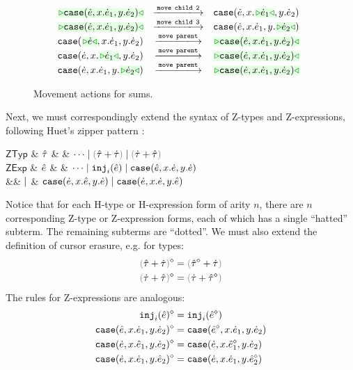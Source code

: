 \begin{figure}
\begin{displaymath}
\begin{array}{@{}rcl}
  \TABperformMove
      {\zwsel{\hcase{\hexp}{x}{\hexp_1}{y}{\hexp_2}}}
      {\aMove{\dChildn{2}}}
      {      {\hcase{\hexp}{x}{\zwsel{\hexp_1}}{y}{\hexp_2}}}
  \\
  \TABperformMove
      {\zwsel{\hcase{\hexp}{x}{\hexp_1}{y}{\hexp_2}}}
      {\aMove{\dChildn{3}}}
      {      {\hcase{\hexp}{x}{\hexp_1}{y}{\zwsel{\hexp_2}}}}
  \\
  \TABperformMove
      {      {\hcase{\zwsel{\hexp}}{x}{\hexp_1}{y}{\hexp_2}}}
      {\aMove{\dParent}}
      {\zwsel{\hcase{{\hexp}}{x}{\hexp_1}{y}{\hexp_2}}}
  \\
  \TABperformMove
      {      {\hcase{{\hexp}}{x}{\zwsel{\hexp_1}}{y}{\hexp_2}}}
      {\aMove{\dParent}}
      {\zwsel{\hcase{{\hexp}}{x}{\hexp_1}{y}{\hexp_2}}}
  \\
  \TABperformMove
      {      {\hcase{{\hexp}}{x}{\hexp_1}{y}{\zwsel{\hexp_2}}}}
      {\aMove{\dParent}}
      {\zwsel{\hcase{{\hexp}}{x}{\hexp_1}{y}{\hexp_2}}}
\end{array}
\end{displaymath}
\vspace{-3px}
\caption{Movement actions for sums.}
\label{fig:sum-move}
\end{figure}

Next, we must correspondingly extend the syntax of Z-types and
Z-expressions, following Huet's zipper pattern \cite{JFP::Huet1997}:\iftr \vspace{-11px} \else \vspace{-3px} \fi 
\begin{grammar}
$\mathsf{ZTyp}$ & $\hat{\tau}$ & \bnfas & $\cdots \bnfalt \tsum{\ztau}{\htau} \bnfalt \tsum{\htau}{\ztau}$
\\
$\mathsf{ZExp}$ & $\hat{e}$ & \bnfas & $\cdots
\mathrel{\mid} \mathtt{inj}_{i}({\hat{e}})
\mathrel{\mid} \mathtt{case}({\hat{e}},{x}.{\dot{e}},{y}.{\dot{e}})$
\\
&& $\mathrel{\mid}$ & $\mathtt{case}({\dot{e}},{x}.{\hat{e}},{y}.{\dot{e}})
\mathrel{\mid}\mathtt{case}({\dot{e}},{x}.{\dot{e}},{y}.{\hat{e}})$
\end{grammar}
Notice that for each H-type or H-expression form of arity $n$, there are
$n$ corresponding Z-type or Z-expression forms, each of which has a single
``hatted'' subterm. The remaining subterms are ``dotted''. We must also
extend the definition of cursor erasure, e.g. for types:
\begin{align*}
\removeSel{\tsum{\ztau}{\htau}} & = \tsum{\removeSel{\ztau}}{\htau}\\
\removeSel{\tsum{\htau}{\ztau}} & = \tsum{\htau}{\removeSel{\ztau}}
\end{align*}
The rules for Z-expressions are analogous:
\begin{align*}
\mathtt{inj}_{i}({\hat{e}})^{\diamond} & = \mathtt{inj}_{i}({\hat{e}^{\diamond}})\\
\mathtt{case}({\hat{e}},{x}.{\dot{e}_1},{y}.{\dot{e}_2})^{\diamond} & = \mathtt{case}({\hat{e}^{\diamond}},{x}.{\dot{e}_1},{y}.{\dot{e}_2})\\
\mathtt{case}({\dot{e}},{x}.{\hat{e}_1},{y}.{\dot{e}_2})^{\diamond} & = \mathtt{case}({\dot{e}},{x}.{\hat{e}_1^{\diamond}},{y}.{\dot{e}_2})\\
\mathtt{case}({\dot{e}},{x}.{\dot{e}_1},{y}.{\hat{e}_2})^{\diamond} & = \mathtt{case}({\dot{e}},{x}.{\dot{e}_1},{y}.{\hat{e}_2^{\diamond}})
\end{align*}

